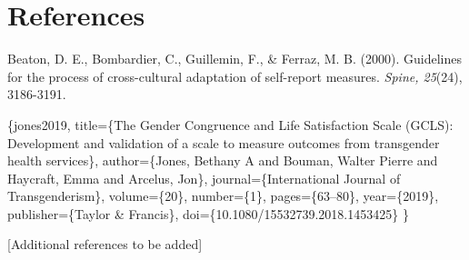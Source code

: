 \documentclass[man,floatsintext,12pt]{apa7}
\begin{document}
\section{References}\label{references}

Beaton, D. E., Bombardier, C., Guillemin, F., \& Ferraz, M. B. (2000).
Guidelines for the process of cross-cultural adaptation of self-report
measures. \emph{Spine, 25}(24), 3186-3191.

\citet{article}\{jones2019, title=\{The Gender Congruence and Life
Satisfaction Scale (GCLS): Development and validation of a scale to
measure outcomes from transgender health services\}, author=\{Jones,
Bethany A and Bouman, Walter Pierre and Haycraft, Emma and Arcelus,
Jon\}, journal=\{International Journal of Transgenderism\},
volume=\{20\}, number=\{1\}, pages=\{63--80\}, year=\{2019\},
publisher=\{Taylor \& Francis\}, doi=\{10.1080/15532739.2018.1453425\}
\}

{[}Additional references to be added{]}
\end{document}
